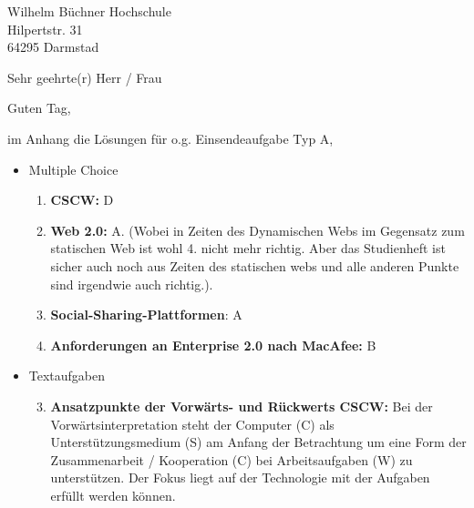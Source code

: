\documentclass[
    version=last,           %
    DIV=13,                 %
    BCOR=0mm,               %
    paper=a4,               %
    fontsize=12pt,          %
    firsthead=on,           %
    firstfoot=on,           %
    pagenumber=on,i         %
    parskip=half,           %
    enlargefirstpage=,      %
    firsthead=on,           %
    fromrule=afteraddress,  %
    priority=off,           %
    backaddress=true,       %
    refline=dateright,      %
	fromalign=right,	    %
    fromemail=on,i          %
    fromurl=on,             %
    frombank=on,
    fromphone=on,           %
    frommobilephone=on      %
    fromlogo=on,            %
    addrfield=on,           %
    subject=untitled,  %
    foldmarks=off,          %
    numericaldate=off,      %
	pagenumber=right,	        %
	parskip=half,	        %
    headsep=false,          %
    footsepline=true,       %
    foldmarks=off,		    %
	]{scrlttr2}
\begin{document}

\begin{letter} {Wilhelm Büchner Hochschule \\
Hilpertstr. 31\\
64295 Darmstad}



\opening{Sehr geehrte(r) Herr / Frau}

Guten Tag,

im Anhang die Lösungen für o.g. Einsendeaufgabe Typ A,
\\
\begin{itemize}
    \item Multiple Choice
        \begin{enumerate}
        \item \textbf{CSCW:} D
        \item \textbf{Web 2.0:} A. (Wobei in Zeiten des Dynamischen  Webs im
            Gegensatz zum statischen Web ist wohl 4. nicht mehr richtig.
            Aber das Studienheft ist sicher auch noch aus Zeiten des statischen
            webs und alle anderen Punkte sind irgendwie auch richtig.).
       \item \textbf{Social-Sharing-Plattformen}: A
       \item \textbf{Anforderungen an Enterprise 2.0 nach MacAfee:} B


        \end{enumerate}
            \vspace{1cm}
    \item Textaufgaben
        \begin{enumerate}
        \setcounter{enumi}{2}
    \item \textbf{Ansatzpunkte der Vorwärts- und Rückwerts CSCW:}
        Bei der Vorwärtsinterpretation steht der Computer (C) als
        Unterstützungsmedium (S) am Anfang der Betrachtung um eine Form
        der Zusammenarbeit / Kooperation (C) bei Arbeitsaufgaben (W) zu
        unterstützen. Der Fokus liegt auf der Technologie mit der Aufgaben
        erfüllt werden können.\\


\end{enumerate}
\end{itemize}
\end{letter}
\end{document}
